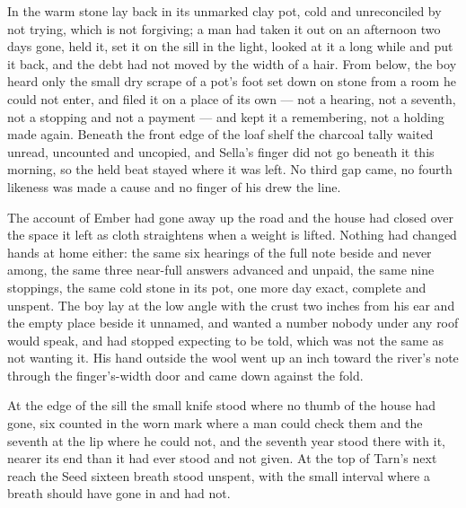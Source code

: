 In  the warm stone lay back in its unmarked clay pot, cold and unreconciled by not trying, which is not forgiving; a man had taken it out on an afternoon two days gone, held it, set it on the sill in the light, looked at it a long while and put it back, and the debt had not moved by the width of a hair. From below, the boy heard only the small dry scrape of a pot's foot set down on stone from a room he could not enter, and filed it on a place of its own --- not a hearing, not a seventh, not a stopping and not a payment --- and kept it a remembering, not a holding made again. Beneath the front edge of the loaf shelf the charcoal tally waited unread, uncounted and uncopied, and Sella's finger did not go beneath it this morning, so the held beat stayed where it was left. No third gap came, no fourth likeness was made a cause and no finger of his drew the line.

The account of Ember had gone away up the road and the house had closed over the space it left as cloth straightens when a weight is lifted. Nothing had changed hands at home either: the same six hearings of the full note beside and never among, the same three near-full answers advanced and unpaid, the same nine stoppings, the same cold stone in its pot, one more day exact, complete and unspent. The boy lay at the low angle with the crust two inches from his ear and the empty place beside it unnamed, and wanted a number nobody under any roof would speak, and had stopped expecting to be told, which was not the same as not wanting it. His hand outside the wool went up an inch toward the river's note through the finger's-width door and came down against the fold.

At the edge of the sill the small knife stood where no thumb of the house had gone, six counted in the worn mark where a man could check them and the seventh at the lip where he could not, and the seventh year stood there with it, nearer its end than it had ever stood and not given. At the top of Tarn's next reach the Seed sixteen breath stood unspent, with the small interval where a breath should have gone in and had not.
